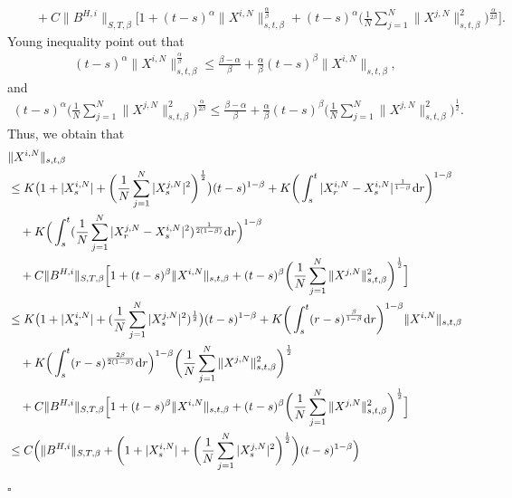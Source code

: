 \documentclass[12pt]{article}
\def\d{\text{\rm{d}}}
\newenvironment{proof}{{\noindent\it Proof.}\ }{\hfill $\square$\par}
\numberwithin{equation}{section}
\begin{document}
\begin{proof}
\begin{equation}
\begin{aligned}
				&\quad+C\|B^{H,i}\|_{S,T,\beta}\Big[ 1+(t-s)^{\alpha}\|X^{i,N}\|_{s,t,\beta}^{\frac{\alpha}{\beta}}+(t-s)^{\alpha}\bigg(\frac{1}{N}\sum_{j=1}^N\|X^{j,N}\|^2_{s,t,\beta}\bigg)^{\frac{\alpha}{2\beta}}  \Big].
			\end{aligned}
		\end{equation}
		Young inequality point out that
		\begin{align*}
			(t-s)^{\alpha}\|X^{i,N}\|_{s,t,\beta}^{\frac{\alpha}{\beta}}\leq \frac{\beta-\alpha}{\beta}+\frac{\alpha}{\beta}(t-s)^{\beta}\|X^{i,N}\|_{s,t,\beta},
		\end{align*}
		and
		\begin{align*}
			(t-s)^{\alpha}(\frac{1}{N}\sum_{j=1}^N\|X^{j,N}\|^2_{s,t,\beta}\big)^{\frac{\alpha}{2\beta}}\leq \frac{\beta-\alpha}{\beta}+\frac{\alpha}{\beta}(t-s)^{\beta}\bigg(\frac{1}{N}\sum_{j=1}^N\|X^{j,N}\|^2_{s,t,\beta}\bigg)^{\frac{1}{2}}.
		\end{align*}
		Thus, we obtain that
		\begin{equation}\label{eq-4.13}
			\begin{aligned}
				&\|X^{i,N}\|_{s,t,\beta}\\
				&\leq K\big(1+|X^{i,N}_s|+\bigg(\frac{1}{N}\sum_{j=1}^N|X^{j,N}_s|^2\bigg)^{\frac{1}{2}}\big)(t-s)^{1-\beta}+K\bigg(\int_{s}^{t}|X^{i,N}_r-X^{i,N}_s|^{\frac{1}{1-\beta}}\d r\bigg)^{1-\beta}\\
				&\quad+K\Big(\int_{s}^{t}(\frac{1}{N}\sum_{j=1}^N|X^{j,N}_r-X^{i,N}_s|^2)^{\frac{1}{2(1-\beta)}}\d r\Big)^{1-\beta}\\
				&\quad+C\|B^{H,i}\|_{S,T,\beta}\Big[ 1+(t-s)^{\beta}\|X^{i,N}\|_{s,t,\beta}+(t-s)^{\beta}\bigg(\frac{1}{N}\sum_{j=1}^N\|X^{j,N}\|^2_{s,t,\beta}\bigg)^{\frac{1}{2}}\Big]\\
				&\leq K\big(1+|X^{i,N}_s|+(\frac{1}{N}\sum_{j=1}^N|X^{j,N}_s|^2)^{\frac{1}{2}}\big)(t-s)^{1-\beta}+K\bigg(\int_{s}^{t}(r-s)^{\frac{\beta}{1-\beta}}\d r\bigg)^{1-\beta}\|X^{i,N}\|_{s,t,\beta}\\
				&\quad+K\Big(\int_{s}^{t}(r-s)^{\frac{2\beta}{2(1-\beta)}}\d r\Big)^{1-\beta}\bigg(\frac{1}{N}\sum_{j=1}^N\|X^{j,N}\|^2_{s,t,\beta}\bigg)^{\frac{1}{2}}\\
				&\quad+C\|B^{H,i}\|_{S,T,\beta}\Big[ 1+(t-s)^{\beta}\|X^{i,N}\|_{s,t,\beta}+(t-s)^{\beta}\bigg(\frac{1}{N}\sum_{j=1}^N\|X^{j,N}\|^2_{s,t,\beta}\bigg)^{\frac{1}{2}}\Big]\\
				&\leq C\Big(\|B^{H,i}\|_{S,T,\beta}+\bigg(1+|X^{i,N}_s|+\bigg(\frac{1}{N}\sum_{j=1}^N|X^{j,N}_s|^2\bigg)^{\frac{1}{2}}\bigg)(t-s)^{1-\beta}\Big)\\

\end{aligned}
\end{equation}
\end{proof}
\end{document}

